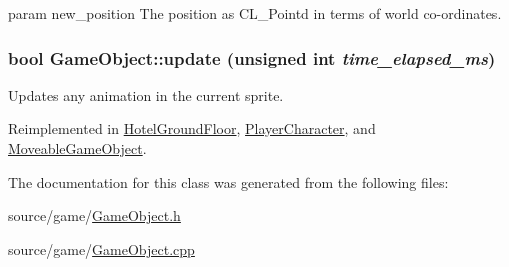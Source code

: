 param new\_\-position The position as CL\_\-Pointd in terms of world co-\/ordinates. \hypertarget{classGameObject_ad2f3cd5d1f5a11b237507cd3ee98b95d}{
\subsubsection[{update}]{\setlength{\rightskip}{0pt plus 5cm}bool GameObject::update (unsigned int {\em time\_\-elapsed\_\-ms})}}
\label{classGameObject_ad2f3cd5d1f5a11b237507cd3ee98b95d}
Updates any animation in the current sprite. 

Reimplemented in \hyperlink{classHotelGroundFloor_a654f889fe9e9d275f2bfee99bef50b76}{HotelGroundFloor}, \hyperlink{classPlayerCharacter_a97278f67b0d1c2646c95f2b9b361f796}{PlayerCharacter}, and \hyperlink{classMoveableGameObject_af2a5d981743e85b4bd35a90f874b361b}{MoveableGameObject}.



The documentation for this class was generated from the following files:\begin{DoxyCompactItemize}
\item 
source/game/\hyperlink{GameObject_8h}{GameObject.h}\item 
source/game/\hyperlink{GameObject_8cpp}{GameObject.cpp}\end{DoxyCompactItemize}
